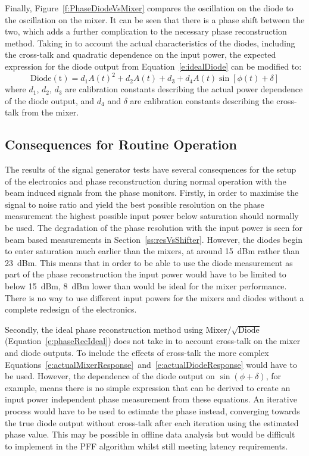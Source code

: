 Finally, Figure~\ref{f:PhaseDiodeVsMixer} compares the oscillation on the diode to the oscillation on the mixer. It can be seen that there is a phase shift between the two, which adds a further complication to the necessary phase reconstruction method. Taking in to account the actual characteristics of the diodes, including the cross-talk and quadratic dependence on the input power, the expected expression for the diode output from Equation~\ref{e:idealDiode} can be modified to:
\begin{equation}
\mathrm{Diode(t)} = d_1A(t)^2 + d_2A(t) + d_3 + d_4A(t)\sin[\phi(t)+\delta]
\label{e:actualDiodeResponse}
\end{equation}
where \(d_1\), \(d_2\), \(d_3\) are calibration constants describing the actual power dependence of the diode output, and \(d_4\) and \(\delta\) are calibration constants describing the cross-talk from the mixer.



\subsection{Consequences for Routine Operation}
\label{ss:sigGenConsq}

The results of the signal generator tests have several consequences for the setup of the electronics and phase reconstruction during normal operation with the beam induced signals from the phase monitors. Firstly, in order to maximise the signal to noise ratio and yield the best possible resolution on the phase measurement the highest possible input power below saturation should normally be used. The degradation of the phase resolution with the input power is seen for beam based measurements in Section~\ref{ss:resVsShifter}. However, the diodes begin to enter saturation much earlier than the mixers, at around 15~dBm rather than 23~dBm. This means that in order to be able to use the diode measurement as part of the phase reconstruction the input power would have to be limited to below 15~dBm, 8~dBm lower than would be ideal for the mixer performance. There is no way to use different input powers for the mixers and diodes without a complete redesign of the electronics.

Secondly, the ideal phase reconstruction method using \(\mathrm{Mixer}/\sqrt{\mathrm{Diode}}\) (Equation~\ref{e:phaseRecIdeal}) does not take in to account cross-talk on the mixer and diode outputs. To include the effects of cross-talk the more complex Equations~\ref{e:actualMixerResponse}~and~\ref{e:actualDiodeResponse} would have to be used.
However, the dependence of the diode output on \(\sin(\phi+\delta)\), for example, means there is no simple expression that can be derived to create an input power independent phase measurement from these equations. An iterative process would have to be used to estimate the phase instead, converging towards the true diode output without cross-talk after each iteration using the estimated phase value. This may be possible in offline data analysis but would be difficult to implement in the PFF algorithm whilst still meeting latency requirements.

